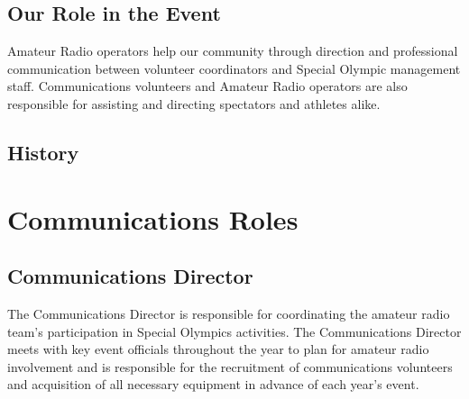 \documentclass[pdflatex,letterpaper,twoside,12pt]{book}
\begin{document}
\section{Our Role in the Event}

Amateur Radio operators help our community through direction and professional communication between volunteer coordinators and Special Olympic management staff.  Communications volunteers and Amateur Radio operators are also responsible for assisting and directing spectators and athletes alike. 


\section{History}


\chapter{Communications Roles}


\section{Communications Director}

The Communications Director is responsible for coordinating the amateur radio team's participation in Special Olympics activities.  The Communications Director meets with key event officials throughout the year to plan for amateur radio involvement and is responsible for the recruitment of communications volunteers and acquisition of all necessary equipment in advance of each year's event.

\end{document}
